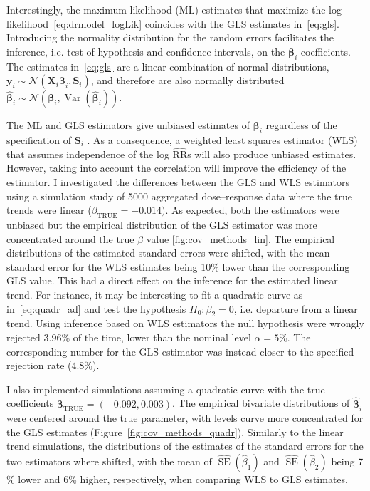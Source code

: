 \documentclass[11pt,a4paper,twoside,openany]{book}\usepackage{knitr}
\DeclareMathOperator{\Var}{Var}
\DeclareMathOperator{\SE}{SE}
\begin{document}
{{\noindent Interestingly, the maximum likelihood (ML) estimates that maximize the log-likelihood~\ref{eq:drmodel_logLik} coincides with the GLS estimates in~\ref{eq:gls}. Introducing the normality distribution for the random errors facilitates the inference, i.e. test of hypothesis and confidence intervals, on the $\boldsymbol{\beta}_i$ coefficients. The estimates in~\ref{eq:gls} are a linear combination of normal distributions, $\mathbf{y}_i \sim \mathcal{N}\left(\mathbf{X}_i \boldsymbol{\beta}_i, \mathbf{S}_i \right)$, and therefore are also normally  distributed $\boldsymbol{\hat \beta}_i \sim \mathcal{N}\left( \boldsymbol{\beta}_i, {\Var} \left( \boldsymbol{\hat \beta}_i \right)\right)$.



The ML and GLS estimators give unbiased estimates of $\boldsymbol{\beta}_i$ regardless of the specification of $\mathbf{S}_i$ \citep{orsini2006generalized}. As a consequence, a weighted least squares estimator (WLS) that assumes independence of the log $\widehat{\mathrm{RR}}$s will also produce unbiased estimates. However, taking into account the correlation will improve the efficiency of the estimator. 
I investigated the differences between the GLS and WLS estimators using a simulation study of 5000 aggregated dose--response data where the true trends were linear ($\beta_\text{TRUE} = -0.014)$. As expected, both the estimators were unbiased but the empirical distribution of the GLS estimator was more concentrated around the true $\beta$ value \ref{fig:cov_methods_lin}. The empirical distributions of the estimated standard errors were shifted, with the mean standard error for the WLS estimates being 10\% lower than the corresponding GLS value. This had a direct effect on the inference for the estimated linear trend. For instance, it may be interesting to fit a quadratic curve as in~\ref{eq:quadr_ad} and test the hypothesis $H_0: \beta_2 = 0$, i.e. departure from a linear trend. Using inference based on WLS estimators the null hypothesis were wrongly rejected 3.96\% of the time, lower than the nominal level $\alpha = 5$\%. The corresponding number for the GLS estimator was instead closer to the specified rejection rate (4.8\%). 

\noindent I also implemented simulations assuming a quadratic curve with the true coefficients $\boldsymbol{\beta}_\text{TRUE} = (-0.092, 0.003)$. The empirical bivariate distributions of $ \boldsymbol{\hat \beta}_i$ were centered around the true parameter, with levels curve more concentrated for the GLS estimates (Figure~\ref{fig:cov_methods_quadr}). Similarly to the linear trend simulations, the distributions of the estimates of the standard errors for the two estimators where shifted, with the mean of $\widehat{\SE} \left( \hat \beta_1 \right)$ and $\widehat{\SE} \left( \hat \beta_2 \right)$ being 7 \% lower and 6\% higher, respectively, when comparing WLS to GLS estimates.

}}
\end{document}
